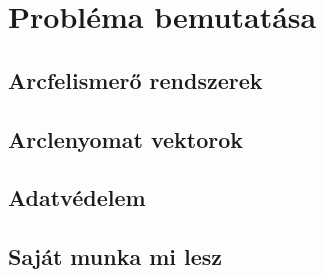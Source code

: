 
\section{Probléma bemutatása}

\subsection{Arcfelismerő rendszerek}

\subsection{Arclenyomat vektorok}

\subsection{Adatvédelem}

\subsection{Saját munka mi lesz}